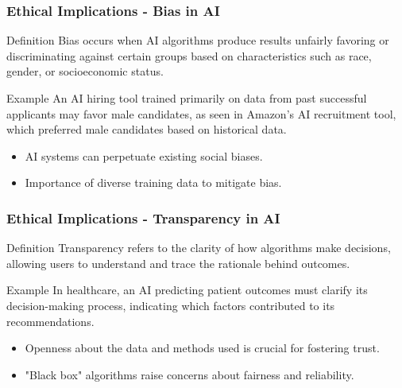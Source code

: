 \documentclass[aspectratio=169]{beamer}
\begin{document}
\begin{frame}[fragile]
    \frametitle{Ethical Implications - Bias in AI}
    \begin{block}{Definition}
        Bias occurs when AI algorithms produce results unfairly favoring or discriminating against certain groups based on characteristics such as race, gender, or socioeconomic status.
    \end{block}
    
    \begin{block}{Example}
        An AI hiring tool trained primarily on data from past successful applicants may favor male candidates, as seen in Amazon's AI recruitment tool, which preferred male candidates based on historical data.
    \end{block}

    \begin{itemize}
        \item AI systems can perpetuate existing social biases.
        \item Importance of diverse training data to mitigate bias.
    \end{itemize}
\end{frame}

\begin{frame}[fragile]
    \frametitle{Ethical Implications - Transparency in AI}
    \begin{block}{Definition}
        Transparency refers to the clarity of how algorithms make decisions, allowing users to understand and trace the rationale behind outcomes.
    \end{block}
    
    \begin{block}{Example}
        In healthcare, an AI predicting patient outcomes must clarify its decision-making process, indicating which factors contributed to its recommendations.
    \end{block}

    \begin{itemize}
        \item Openness about the data and methods used is crucial for fostering trust.
        \item "Black box" algorithms raise concerns about fairness and reliability.
    \end{itemize}
\end{frame}
\end{document}
